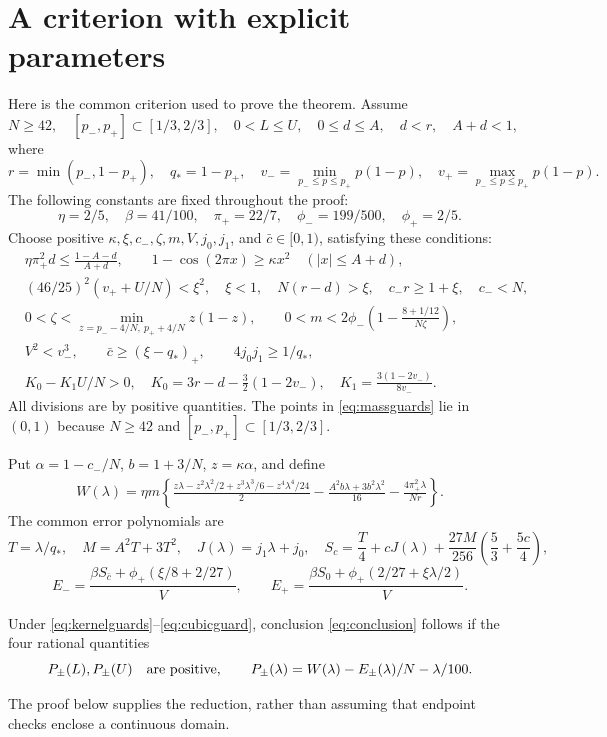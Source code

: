 \documentclass[11pt]{article}
\begin{document}
\section{A criterion with explicit parameters}

Here is the common criterion used to prove the theorem. Assume
\[
N\ge42,\quad [p_-,p_+]\subset[1/3,2/3],\quad 0<L\le U,\quad
0\le d\le A,\quad d<r,\quad A+d<1,
\]
where
\[
r=\min(p_-,1-p_+),\quad q_*=1-p_+,\quad
v_-=\min_{p_-\le p\le p_+}p(1-p),\quad
v_+=\max_{p_-\le p\le p_+}p(1-p).
\]
The following constants are fixed throughout the proof:
\[
\eta=2/5,\quad \beta=41/100,\quad
\pi_+=22/7,\quad \phi_-=199/500,\quad\phi_+=2/5.
\]
Choose positive $\kappa,\xi,c_-,\zeta,m,V,j_0,j_1$, and
$\bar c\in[0,1)$, satisfying these conditions:
\begin{align}
&\eta\pi_+^2d\le\frac{1-A-d}{A+d},
\qquad 1-\cos(2\pi x)\ge\kappa x^2\quad(|x|\le A+d),\label{eq:kernelguards}\\
&(46/25)^2(v_++U/N)<\xi^2,\quad \xi<1,\quad
N(r-d)>\xi,\quad c_-r\ge1+\xi,\quad c_-<N,\label{eq:phaseguards}\\
&0<\zeta<\min_{z=p_--4/N,\ p_++4/N}z(1-z),\qquad
0<m<2\phi_-\left(1-\frac{8+1/12}{N\zeta}\right),\label{eq:massguards}\\
&V^2<v_-^3,\qquad
\bar c\ge(\xi-q_*)_+,\qquad 4j_0j_1\ge1/q_*,\label{eq:curvguards}\\
&K_0-K_1U/N>0,\quad
K_0=3r-d-\tfrac32(1-2v_-),\quad
K_1=\frac{3(1-2v_-)}{8v_-}.\label{eq:cubicguard}
\end{align}
All divisions are by positive quantities. The points in
\eqref{eq:massguards} lie in $(0,1)$ because $N\ge42$ and
$[p_-,p_+]\subset[1/3,2/3]$.

Put $\alpha=1-c_-/N$, $b=1+3/N$, $z=\kappa\alpha$, and define
\begin{align}
W(\lambda)=\eta m\left\{
\frac{z\lambda-z^2\lambda^2/2+z^3\lambda^3/6-z^4\lambda^4/24}{2}
-\frac{A^2b\lambda+3b^2\lambda^2}{16}
-\frac{4\pi_+^2\lambda}{Nr}\right\}.\label{eq:W}
\end{align}
The common error polynomials are
\[
T=\lambda/q_*,\quad M=A^2T+3T^2,\quad J(\lambda)=j_1\lambda+j_0,
\quad S_c=\frac T4+cJ(\lambda)+\frac{27M}{256}\left(\frac53+\frac{5c}4\right),
\]
\begin{equation}\label{eq:errors}
E_-=\frac{\beta S_{\bar c}+\phi_+(\xi/8+2/27)}V,\qquad
E_+=\frac{\beta S_0+\phi_+(2/27+\xi\lambda/2)}V .
\end{equation}

\begin{lemma}\label{lem:criterion}
Under \eqref{eq:kernelguards}--\eqref{eq:cubicguard}, conclusion
\eqref{eq:conclusion} follows if the four rational quantities
\[
P_\pm(L),P_\pm(U)\quad\hbox{are positive},\qquad
P_\pm(\lambda)=W(\lambda)-E_\pm(\lambda)/N-\lambda/100.
\]
\end{lemma}
The proof below supplies the reduction, rather than assuming that endpoint
checks enclose a continuous domain.
\end{document}
